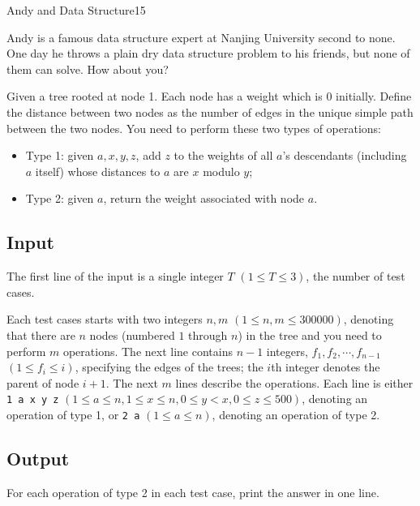 \begin{Problem}{Andy and Data Structure}{15}

Andy is a famous data structure expert at Nanjing University second to none. One day he throws a plain dry data structure problem to his friends, but none of them can solve. How about you?

Given a tree rooted at node 1. Each node has a weight which is 0 initially. Define the distance between two nodes as the number of edges in the unique simple path between the two nodes. You need to perform these two types of operations:
\begin{itemize}
\item Type 1: given $a, x, y, z$, add $z$ to the weights of all $a$'s descendants (including $a$ itself) whose distances to $a$ are $x$ modulo $y$;
\item Type 2: given $a$, return the weight associated with node $a$.
\end{itemize}

\subsection*{Input}

The first line of the input is a single integer $T$ $(1 \leq T \leq 3)$, the number of test cases.

Each test cases starts with two integers $n, m$ $(1 \leq n, m \leq 300000)$, denoting that there are $n$ nodes (numbered $1$ through $n$) in the tree and you need to perform $m$ operations. The next line contains $n-1$ integers, $f_1, f_2, \cdots, f_{n-1}$ $(1 \leq f_i \leq i)$, specifying the edges of the trees; the $i$th integer denotes the parent of node $i+1$. The next $m$ lines describe the operations. Each line is either \texttt{1 a x y z} $(1 \leq a \leq n, 1 \leq x \leq n, 0 \leq y < x, 0 \leq z \leq 500)$, denoting an operation of type 1, or \texttt{2 a} $(1 \leq a \leq n)$, denoting an operation of type 2.

\subsection*{Output}

For each operation of type 2 in each test case, print the answer in one line.


\end{Problem}
